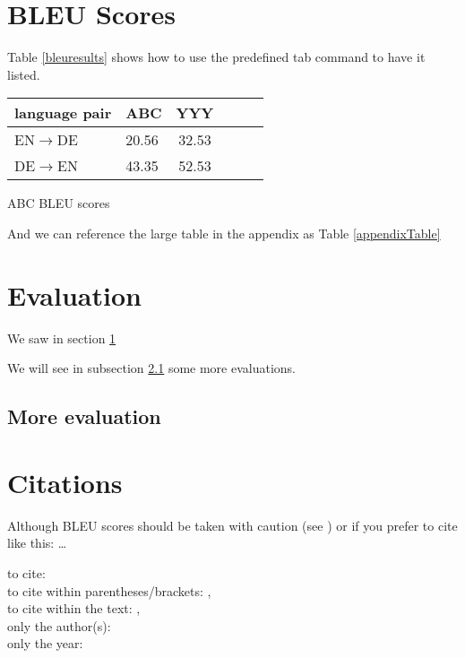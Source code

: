 
\label{chap:5_results}

\section{BLEU Scores}
\label{sec:5_bleuscores}

Table \ref{bleuresults} shows how to use the predefined tab command to have it listed.
{\begin{tabular}{ll|ccc|c}
language pair		& ABC	& YYY	\\
\hline
EN$\rightarrow$DE	& 20.56	& 32.53 \\
DE$\rightarrow$EN	& 43.35	& 52.53 \\
\hline
\end{tabular}
}{ABC BLEU scores}

And we can reference the large table in the appendix as Table \ref{appendixTable}

\section{Evaluation}
\label{sec:5_evaluation}
We saw in section \ref{sec:5_bleuscores} 

We will see in subsection \ref{subsec:5_moreeval} some more evaluations.

\subsection{More evaluation}
\label{subsec:5_moreeval}


\section{Citations}
Although BLEU scores should be taken with caution (see \citet{Callison-Burch2006})
or if you prefer to cite like this: \citep{Callison-Burch2006} \ldots

to cite: \cite[30-31]{Koehn2005} \\
to cite within parentheses/brackets: \citep{Koehn2005}, \citep[30-32]{Koehn2005}\\ %

to cite within the text: \citet{Koehn2005}, \citet[37]{Koehn2005}\\
only the author(s): \citeauthor{Callison-Burch2006}\\
only the year: \citeyear{Callison-Burch2006}\\

